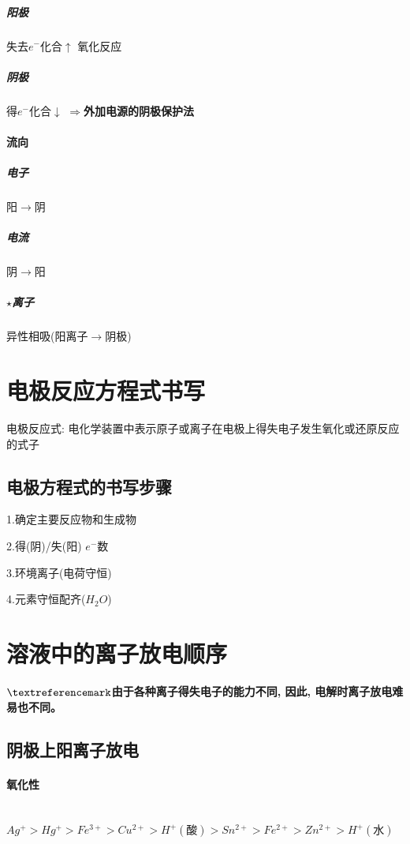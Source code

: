 \documentclass[10pt,cn]{elegantbook}
\begin{document}
\subparagraph*{阳极}
失去$e^{-}$化合$\uparrow$ 氧化反应
\subparagraph*{阴极}
得$e^{-}$化合$\downarrow$ $\Rightarrow$\textbf{外加电源的阴极保护法}

\paragraph*{流向}

\subparagraph*{电子}

阳$\rightarrow$阴

\subparagraph*{电流}

阴$\rightarrow$阳

\subparagraph*{$\star$离子}

异性相吸(阳离子$\rightarrow$阴极)

\section{电极反应方程式书写}

电极反应式: 电化学装置中表示原子或离子在电极上得失电子发生氧化或还原反应的式子

\subsection{电极方程式的书写步骤}

1.确定主要反应物和生成物

2.得(阴)/失(阳)  $e^{-}$数

3.环境离子(电荷守恒)

4.元素守恒配齐($H_{2}O$)

\section{溶液中的离子放电顺序}

\textbf{$\textreferencemark$由于各种离子得失电子的能力不同, 因此, 电解时离子放电难易也不同。}

\subsection{阴极上阳离子放电}

\paragraph*{氧化性}~{}\\

$Ag^{+} > Hg^{+} > Fe^{3+} > Cu^{2+} > H^{+}(\mbox{酸}) > Sn^{2+} > Fe^{2+} > Zn^{2+} > H^{+}(\mbox{水})$
\end{document}
